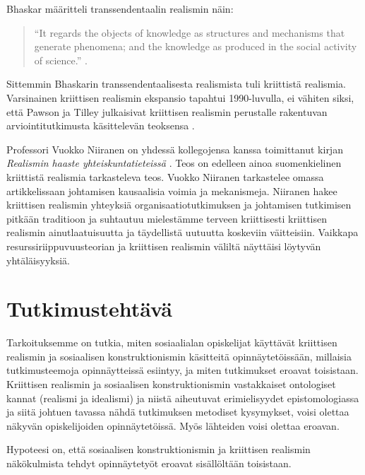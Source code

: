 \documentclass[a4paper,11pt,finnish]{article}
\begin{document}
Bhaskar määritteli transsendentaalin realismin näin:

\begin{quote}
``It regards the objects of knowledge as structures and mechanisms that
generate phenomena; and the knowledge as produced in the social activity
of science.'' \citep{Bhaskar_1975}.
\end{quote}

Sittemmin Bhaskarin transsendentaalisesta realismista tuli kriittistä
realismia. Varsinainen kriittisen realismin ekspansio tapahtui
1990-luvulla, ei vähiten siksi, että Pawson ja Tilley julkaisivat
kriittisen realismin perustalle rakentuvan arviointitutkimusta
käsittelevän teoksensa \citep{RefWorks:1045}.

Professori Vuokko Niiranen on yhdessä kollegojensa kanssa toimittanut
kirjan \emph{Realismin haaste yhteiskuntatieteissä} \citep{Solr-jykdok.1004015}.
Teos on edelleen ainoa suomenkielinen kriittistä realismia tarkasteleva
teos. Vuokko Niiranen tarkastelee omassa artikkelissaan johtamisen
kausaalisia voimia ja mekanismeja. \citep{niiranen2006} Niiranen hakee
kriittisen realismin yhteyksiä organisaatiotutkimuksen ja johtamisen
tutkimisen pitkään traditioon ja suhtautuu mielestämme terveen
kriittisesti kriittisen realismin ainutlaatuisuutta ja täydellistä
uutuutta koskeviin väitteisiin. Vaikkapa resurssiriippuvuusteorian ja
kriittisen realismin väliltä näyttäisi löytyvän yhtäläisyyksiä.

\par\null

\section*{Tutkimustehtävä}

Tarkoituksemme on tutkia, miten sosiaalialan opiskelijat käyttävät
kriittisen realismin ja sosiaalisen konstruktionismin käsitteitä
opinnäytetöissään, millaisia tutkimusteemoja opinnäytteissä esiintyy, ja
miten tutkimukset eroavat toisistaan. Kriittisen realismin ja
sosiaalisen konstruktionismin vastakkaiset ontologiset kannat (realismi
ja idealismi) ja niistä aiheutuvat erimielisyydet epistomologiassa ja
siitä johtuen tavassa nähdä tutkimuksen metodiset kysymykset, voisi
olettaa näkyvän opiskelijoiden opinnäytetöissä. Myös lähteiden voisi
olettaa eroavan.

Hypoteesi on, että sosiaalisen konstruktionismin ja kriittisen realismin
näkökulmista tehdyt opinnäytetyöt eroavat sisällöltään toisistaan.
\end{document}
